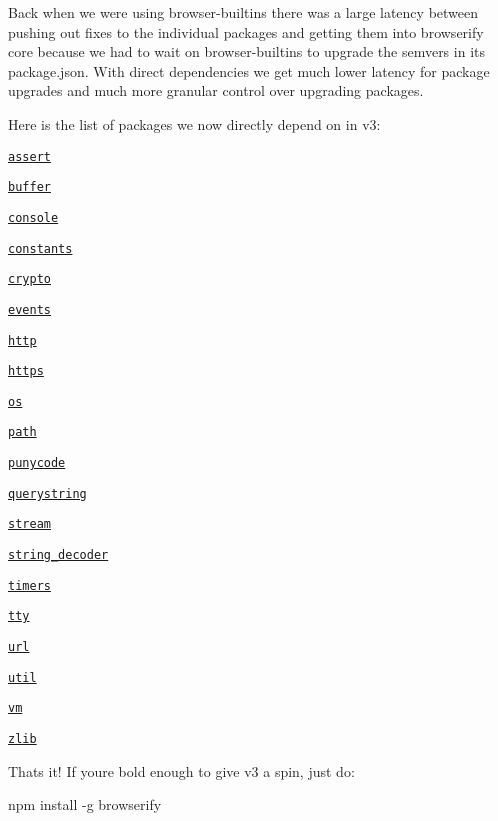 Back when we were using browser-\/builtins there was a large latency between pushing out fixes to the individual packages and getting them into browserify core because we had to wait on browser-\/builtins to upgrade the semvers in its package.\+json. With direct dependencies we get much lower latency for package upgrades and much more granular control over upgrading packages.

Here is the list of packages we now directly depend on in v3\+:


\begin{DoxyItemize}
\item \href{https://npmjs.org/package/assert}{\tt assert}
\item \href{https://npmjs.org/package/native-buffer-browserify}{\tt buffer}
\item \href{https://npmjs.org/package/console-browserify}{\tt console}
\item \href{https://npmjs.org/package/constants-browserify}{\tt constants}
\item \href{https://npmjs.org/package/crypto-browserify}{\tt crypto}
\item \href{https://npmjs.org/package/events-browserify}{\tt events}
\item \href{https://npmjs.org/package/http-browserify}{\tt http}
\item \href{https://npmjs.org/package/https-browserify}{\tt https}
\item \href{https://npmjs.org/package/os-browserify}{\tt os}
\item \href{https://npmjs.org/package/path-browserify}{\tt path}
\item \href{https://npmjs.org/package/punycode}{\tt punycode}
\item \href{https://npmjs.org/package/querystring}{\tt querystring}
\item \href{https://npmjs.org/package/stream-browserify}{\tt stream}
\item \href{https://npmjs.org/package/string_decoder}{\tt string\+\_\+decoder}
\item \href{https://npmjs.org/package/timers-browserify}{\tt timers}
\item \href{https://npmjs.org/package/tty-browserify}{\tt tty}
\item \href{https://npmjs.org/package/url}{\tt url}
\item \href{https://npmjs.org/package/util}{\tt util}
\item \href{https://npmjs.org/package/vm-browserify}{\tt vm}
\item \href{https://npmjs.org/package/zlib-browserify}{\tt zlib}
\end{DoxyItemize}

That\textquotesingle{}s it! If you\textquotesingle{}re bold enough to give v3 a spin, just do\+:


\begin{DoxyCode}
npm install -g browserify
\end{DoxyCode}
 